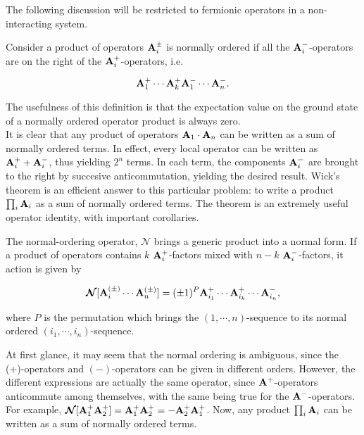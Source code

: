 The following discussion will be restricted to 
fermionic operators in a non-interacting system. 

\begin{definition}

Consider a product of operators ${\bf A}_i^{\pm}$ is normally ordered if all the ${\bf A}_i^{-}$-operators are on the right of the ${\bf A}_i^{+}$-operators, i.e.

$$
    {\bf A}_1^{+} \cdots {\bf A}_k^{+} {\bf A}_1^{-} \cdots {\bf A}_n^{-}.
$$

\end{definition}

The usefulness of this definition is that the expectation value on the ground state of a normally ordered operator product is always zero. \\

It is clear that any product of operators ${\bf A}_1 \cdot {\bf A}_n$ can be written as a sum of normally ordered terms. In effect, every local operator can be written as ${\bf A}_i^{+} + {\bf A}_i^{-}$, thus yielding $2^n$ terms. In each term, the components ${\bf A}_i^{-}$ are brought to the right by succesive anticommutation, yielding the desired result. Wick's theorem is an efficient answer to this particular problem: to write a product $\prod_{i} {\bf A}_i$ as a sum of normally ordered terms. The theorem is an extremely useful operator identity, with important corollaries. \\

\begin{definition}
    The normal-ordering operator, $\bm{\mathcal{N}}$ brings a generic product into a normal form. If a product of operators contains $k$ ${\bf A}_i^+$-factors mixed with $n-k$ ${\bf A}^-_i$-factors, it action is given by 
    
    \begin{equation}
        \bm{\mathcal{N}} [{\bf A}_i^{(\pm)} \cdots {\bf A}_n^{(\pm)}] = (\pm 1)^{P} {\bf A}_{i_1}^{+} \cdots {\bf A}_{i_k}^{+} \cdots {\bf A}_{i_n}^{-}, 
    \end{equation}
    
    where $P$ is the permutation which brings the $(1, \cdots,n)$-sequence to its normal ordered $(i_1, \cdots, i_n)$-sequence. \\
\end{definition}

At first glance, it may seem that the normal ordering is ambiguous, since the (+)-operators and $(-)$-operators can be given in different orders. However, the different expressions are actually the same operator, since ${\bf A}^+$-operators anticommute among themselves, with the same being true for the ${\bf A}^-$-operators. For example, $\bm{\mathcal{N}}[{{\bf A}_1^+ {\bf A}_2^+}] = {{\bf A}_1^+ {\bf A}_2^+} = - {{\bf A}_2^+ {\bf A}_1^+}$. Now, any product $\prod_i {\bf A}_i$ can be written as a sum of normally ordered terms. 


